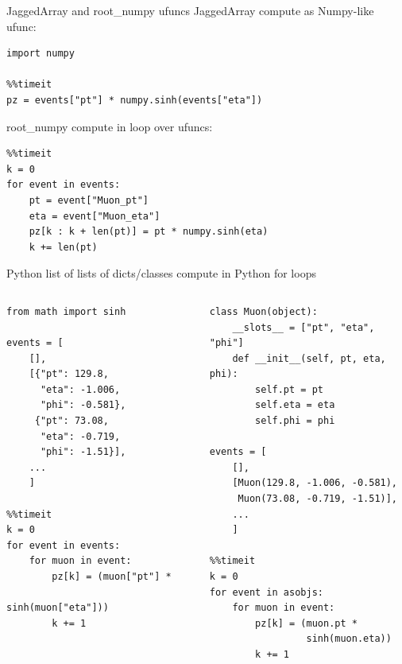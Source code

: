 \documentclass[aspectratio=169]{beamer}
\begin{document}
\begin{frame}[fragile]{JaggedArray and root\_numpy ufuncs}
\scriptsize
{\normalsize JaggedArray compute as Numpy-like ufunc:}
\begin{verbatim}
import numpy

%%timeit
pz = events["pt"] * numpy.sinh(events["eta"])
\end{verbatim}

\vspace{0.5 cm}
\hfill\begin{minipage}{0.6\linewidth}
{\normalsize root\_numpy compute in loop over ufuncs:}
\begin{verbatim}
%%timeit
k = 0
for event in events:
    pt = event["Muon_pt"]
    eta = event["Muon_eta"]
    pz[k : k + len(pt)] = pt * numpy.sinh(eta)
    k += len(pt)
\end{verbatim}
\end{minipage}
\end{frame}

\begin{frame}[fragile]{Python list of lists of dicts/classes compute in Python for loops}
\scriptsize
\begin{columns}[t]
\begin{verbatim}
from math import sinh

events = [
    [],
    [{"pt": 129.8,
      "eta": -1.006,
      "phi": -0.581},
     {"pt": 73.08,
      "eta": -0.719,
      "phi": -1.51}],
    ...
    ]

%%timeit
k = 0
for event in events:
    for muon in event:
        pz[k] = (muon["pt"] *
                 sinh(muon["eta"]))
        k += 1
\end{verbatim}

\begin{verbatim}
class Muon(object):
    __slots__ = ["pt", "eta", "phi"]
    def __init__(self, pt, eta, phi):
        self.pt = pt
        self.eta = eta
        self.phi = phi

events = [
    [],
    [Muon(129.8, -1.006, -0.581),
     Muon(73.08, -0.719, -1.51)],
    ...
    ]

%%timeit
k = 0
for event in asobjs:
    for muon in event:
        pz[k] = (muon.pt *
                 sinh(muon.eta))
        k += 1
\end{verbatim}
\end{columns}
\end{frame}
\end{document}
